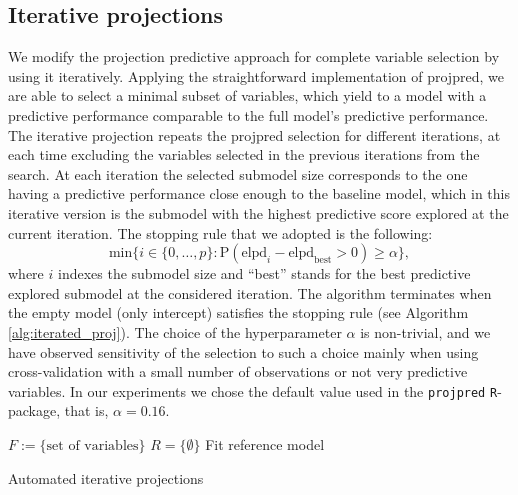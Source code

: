 \documentclass[a4]{article}
\theoremstyle{definition}
\begin{document}
\subsection{Iterative projections}

We modify the projection predictive approach for complete variable
selection by using it iteratively.  Applying the straightforward
implementation of projpred, we are able to select a minimal subset of
variables, which yield to a model with a predictive performance
comparable to the full model's predictive performance. 
 The iterative projection repeats
the projpred selection for different iterations, at each time
excluding the variables selected in the previous
iterations from the search.
 At each iteration the selected submodel size corresponds to the
one having a predictive performance close enough to the baseline
model, which in this iterative version is the submodel with the
highest predictive score explored at the current iteration. The
stopping rule that we adopted is the following:
\begin{equation} 
\label{eq:rule_of_thumb}
\text{min} \{i\in \{0,\ldots,p\}: \text{P}(\text{elpd}_{i}-\text{elpd}_{\text{best}}>0)\geq \alpha \},
\end{equation}
where $i$ indexes the submodel size and ``best'' stands for the best predictive explored submodel
at the considered iteration. The algorithm terminates when the empty model (only intercept) satisfies
the stopping rule (see Algorithm \ref{alg:iterated_proj}).
The choice of the hyperparameter $\alpha$ is non-trivial, and we have 
observed sensitivity of the selection to such a choice mainly when using cross-validation with a small
number of observations or not very predictive variables. 
In our experiments we chose the default value used in the \texttt{projpred} 
\texttt{R}-package, that is, $\alpha=0.16$.

\begin{center}
\begin{algorithm}[H]
\SetAlgoLined
{}
 $F:=\{\text{set of variables}\}$ \;
 $R=\{\emptyset\}$ \;
 Fit reference model\;
 \caption{Automated iterative projections}
 \label{alg:iterated_proj}
\end{algorithm}
\end{center}
\end{document}
